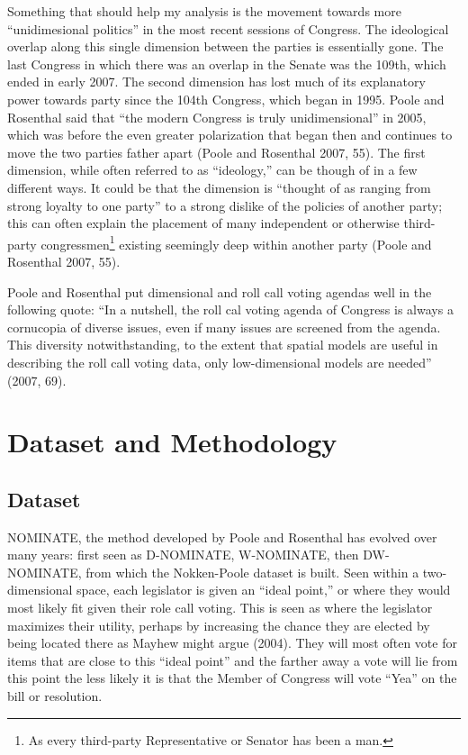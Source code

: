 \documentclass[12pt,twoside]{reedthesis}
\begin{document}
  Something that should help my analysis is the movement towards more
  ``unidimesional politics'' in the most recent sessions of Congress. The
  ideological overlap along this single dimension between the parties is
  essentially gone. The last Congress in which there was an overlap in the
  Senate was the 109th, which ended in early 2007. The second dimension
  has lost much of its explanatory power towards party since the 104th
  Congress, which began in 1995. Poole and Rosenthal said that ``the
  modern Congress is truly unidimensional'' in 2005, which was before the
  even greater polarization that began then and continues to move the two
  parties father apart (Poole and Rosenthal 2007, 55). The first
  dimension, while often referred to as ``ideology,'' can be though of in
  a few different ways. It could be that the dimension is ``thought of as
  ranging from strong loyalty to one party'' to a strong dislike of the
  policies of another party; this can often explain the placement of many
  independent or otherwise third-party congressmen\footnote{As every
    third-party Representative or Senator has been a man.} existing
  seemingly deep within another party (Poole and Rosenthal 2007, 55).
  
  Poole and Rosenthal put dimensional and roll call voting agendas well in
  the following quote: ``In a nutshell, the roll cal voting agenda of
  Congress is always a cornucopia of diverse issues, even if many issues
  are screened from the agenda. This diversity notwithstanding, to the
  extent that spatial models are useful in describing the roll call voting
  data, only low-dimensional models are needed'' (2007, 69).
  
  \chapter{Dataset and Methodology}\label{dataset-and-methodology}
  
  \section{Dataset}\label{dataset}
  
  NOMINATE, the method developed by Poole and Rosenthal has evolved over
  many years: first seen as D-NOMINATE, W-NOMINATE, then DW-NOMINATE, from
  which the Nokken-Poole dataset is built. Seen within a two-dimensional
  space, each legislator is given an ``ideal point,'' or where they would
  most likely fit given their role call voting. This is seen as where the
  legislator maximizes their utility, perhaps by increasing the chance
  they are elected by being located there as Mayhew might argue (2004).
  They will most often vote for items that are close to this ``ideal
  point'' and the farther away a vote will lie from this point the less
  likely it is that the Member of Congress will vote ``Yea'' on the bill
  or resolution.
  
\end{document}
